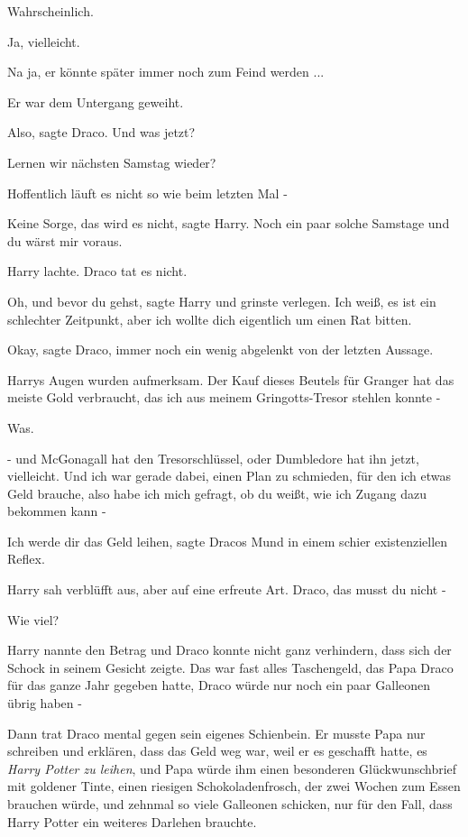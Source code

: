 Wahrscheinlich.

Ja, vielleicht.

Na ja, er könnte später immer noch zum Feind werden ...

Er war dem Untergang geweiht.

\glqq{}Also\grqq{}, sagte Draco. \glqq{}Und was jetzt?\grqq{}

\glqq{}Lernen wir nächsten Samstag wieder?\grqq{}

\glqq{}Hoffentlich läuft es nicht so wie beim letzten Mal -\grqq{}

\glqq{}Keine Sorge, das wird es nicht\grqq{}, sagte Harry. \glqq{}Noch ein paar
solche Samstage und du wärst mir voraus.\grqq{}

Harry lachte. Draco tat es nicht.

\glqq{}Oh, und bevor du gehst\grqq{}, sagte Harry und grinste verlegen.
\glqq{}Ich weiß, es ist ein schlechter Zeitpunkt, aber ich wollte dich
eigentlich um einen Rat bitten.\grqq{}

\glqq{}Okay\grqq{}, sagte Draco, immer noch ein wenig abgelenkt von der letzten
Aussage.

Harrys Augen wurden aufmerksam. \glqq{}Der Kauf dieses Beutels für Granger hat
das meiste Gold verbraucht, das ich aus meinem Gringotts-Tresor stehlen konnte
-\grqq{}

Was.

\glqq{}- und McGonagall hat den Tresorschlüssel, oder Dumbledore hat ihn jetzt,
vielleicht. Und ich war gerade dabei, einen Plan zu schmieden, für den ich etwas
Geld brauche, also habe ich mich gefragt, ob du weißt, wie ich Zugang dazu
bekommen kann -\grqq{}

\glqq{}Ich werde dir das Geld leihen\grqq{}, sagte Dracos Mund in einem schier
existenziellen Reflex.

Harry sah verblüfft aus, aber auf eine erfreute Art. \glqq{}Draco, das musst du
nicht -\grqq{}

\glqq{}Wie viel?\grqq{}

Harry nannte den Betrag und Draco konnte nicht ganz verhindern, dass sich der
Schock in seinem Gesicht zeigte. Das war fast alles Taschengeld, das Papa Draco
für das ganze Jahr gegeben hatte, Draco würde nur noch ein paar Galleonen übrig
haben -

Dann trat Draco mental gegen sein eigenes Schienbein. Er musste Papa nur
schreiben und erklären, dass das Geld weg war, weil er es geschafft hatte, es
\emph{Harry Potter zu leihen}, und Papa würde ihm einen besonderen
Glückwunschbrief mit goldener Tinte, einen riesigen Schokoladenfrosch, der zwei
Wochen zum Essen brauchen würde, und zehnmal so viele Galleonen schicken, nur
für den Fall, dass Harry Potter ein weiteres Darlehen brauchte.

